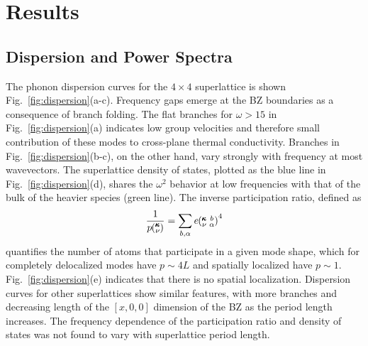 \documentclass[aps,prb,preprint,preprintnumbers,amsmath,amssymb,floatfix,superscriptaddress]{revtex4}
\newcommand{\kvba}{\mspace{-4.0mu}\left(\mspace{-8.0mu}
\begin{smallmatrix} &\pmb{\kappa} &b \\ &\nu &\alpha\end{smallmatrix}
\mspace{-3.0mu}\right)}
\newcommand{\kv}{\mspace{-4.0mu}\left(\mspace{-8.0mu}
\begin{smallmatrix}&\pmb{\kappa} \\&\nu\end{smallmatrix}
\mspace{-3.0mu}\right)}
\begin{document}

\section{Results}\label{SEC:results}
\subsection{Dispersion and Power Spectra}

The phonon dispersion curves for the $4\times4$ superlattice is shown Fig.~\ref{fig:dispersion}(a-c). Frequency gaps emerge at the BZ boundaries as a consequence of branch folding.\cite{PhysRevB.38.1427,PhysRevB.60.2627} The flat branches for $\omega > 15$ in Fig.~\ref{fig:dispersion}(a) indicates low group velocities and therefore small contribution of these modes to cross-plane thermal conductivity. Branches in Fig.~\ref{fig:dispersion}(b-c), on the other hand, vary strongly with frequency at most wavevectors. The superlattice density of states, plotted as the blue line in Fig.~\ref{fig:dispersion}(d), shares the $\omega^2$ behavior at low frequencies with that of the bulk of the heavier species (green line). The inverse participation ratio, defined as 
\begin{equation}\label{EQ:P_ratio}
\begin{split}
\frac{1}{p\kv}=\sum_{b,\alpha}e\kvba^4
\end{split}
\end{equation}
quantifies the number of atoms that participate in a given mode shape, which for completely delocalized modes have $p\sim 4L$ and spatially localized have $p\sim 1$.\cite{PhysRevB.70.235214} Fig.~\ref{fig:dispersion}(e) indicates that there is no spatial localization.  Dispersion curves for other superlattices show similar features, with more branches and decreasing length of the $[x,0,0]$ dimension of the BZ as the period length increases. The frequency dependence of the participation ratio and density of states was not found to vary with superlattice period length.
\renewcommand{\topfraction}{0.7}
\begin{figure*}%
\begin{center}
\renewcommand{\figure}{Fig.}
\caption{Dispersion (a,b,c), density of states (d) and inverse participation ratio (e) of a $4\times4$ superlattice. Labeled gray squares represent select modes for Fig.~\ref{fig:sed}. Orange lines correspond the bulk of the lighter species and green lines correspond to the bulk of the heavier species.}
\label{fig:dispersion}
\end{center}
\end{figure*}
\end{document}
